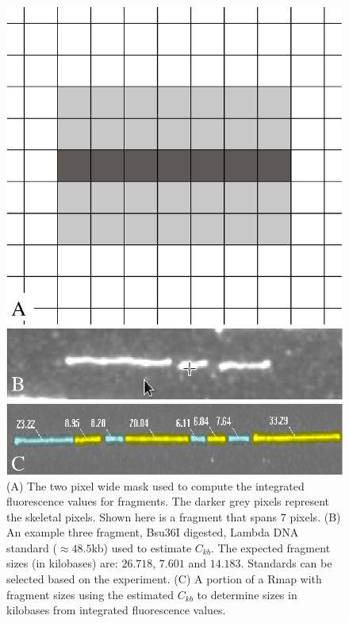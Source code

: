 \documentclass{bmcart}
\begin{document}
\begin{backmatter}
\begin{figure}[h!]
\centering
\includegraphics[width=0.8\linewidth]{sizing_figure}
\caption{
(A) The two pixel wide mask used to compute the integrated fluorescence 
values for fragments. The darker grey pixels represent the skeletal pixels. 
Shown here is a fragment that spans $7$ pixels. (B) An example three fragment, 
Bsu36I digested, Lambda DNA standard ($\approx 48.5$kb) used to estimate 
$C_{kb}$. The expected fragment sizes (in kilobases) are: $26.718$, $7.601$ 
and $14.183$. Standards can be selected based on the experiment. (C) A portion 
of a Rmap with fragment sizes using the estimated $C_{kb}$ to determine sizes 
in kilobases from integrated fluorescence values.}
\label{fig:size}
\end{figure}




\end{backmatter}
\end{document}
